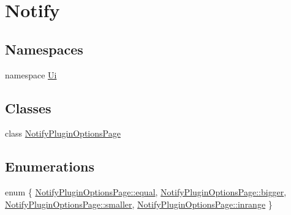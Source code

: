 \hypertarget{group__notify}{\section{Notify}
\label{group__notify}
}
\subsection*{Namespaces}
\begin{DoxyCompactItemize}
\item 
namespace \hyperlink{namespace_ui}{Ui}
\end{DoxyCompactItemize}
\subsection*{Classes}
\begin{DoxyCompactItemize}
\item 
class \hyperlink{class_notify_plugin_options_page}{Notify\-Plugin\-Options\-Page}
\end{DoxyCompactItemize}
\subsection*{Enumerations}
\begin{DoxyCompactItemize}
\item 
enum \{ \hyperlink{group__notify_gga986cf4be07b969743c640a94c64951a6a5215660515a642089b68f6e4fb7ebb77}{Notify\-Plugin\-Options\-Page\-::equal}, 
\hyperlink{group__notify_gga986cf4be07b969743c640a94c64951a6a0645a6aff2f8f76e753f1eaf08fd4cb0}{Notify\-Plugin\-Options\-Page\-::bigger}, 
\hyperlink{group__notify_gga986cf4be07b969743c640a94c64951a6a3bd98b14a252e90591e9f7b8c70c995b}{Notify\-Plugin\-Options\-Page\-::smaller}, 
\hyperlink{group__notify_gga986cf4be07b969743c640a94c64951a6a4cd2df3d72786caddbe5e90598da981a}{Notify\-Plugin\-Options\-Page\-::inrange}
 \}
\end{DoxyCompactItemize}
